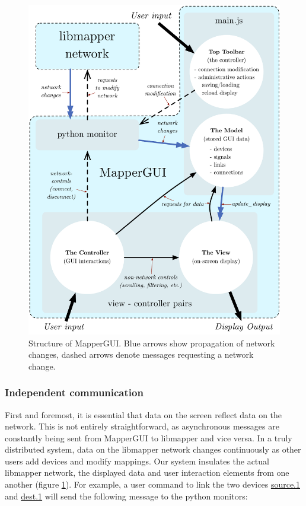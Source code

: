 \begin{figure}
\centering
	\includegraphics[width=\textwidth]{figures/mapper_network}
\caption{Structure of MapperGUI. Blue arrows show propagation of network changes, dashed arrows denote messages requesting a network change.}
\label{fig:mapper_network}
\end{figure}


		\subsubsection{Independent communication}

First and foremost, it is essential that data on the screen reflect data on the network. This is not entirely straightforward, as asynchronous messages are constantly being sent from MapperGUI to libmapper and vice versa. In a truly distributed system, data on the libmapper network changes continuously as other users add devices and modify mappings. Our system insulates the actual libmapper network, the displayed data and user interaction elements from one another (figure \ref{fig:mapper_network}). For example, a user command to link the two devices \url{source.1} and \url{dest.1} will send the following message to the python monitors:

